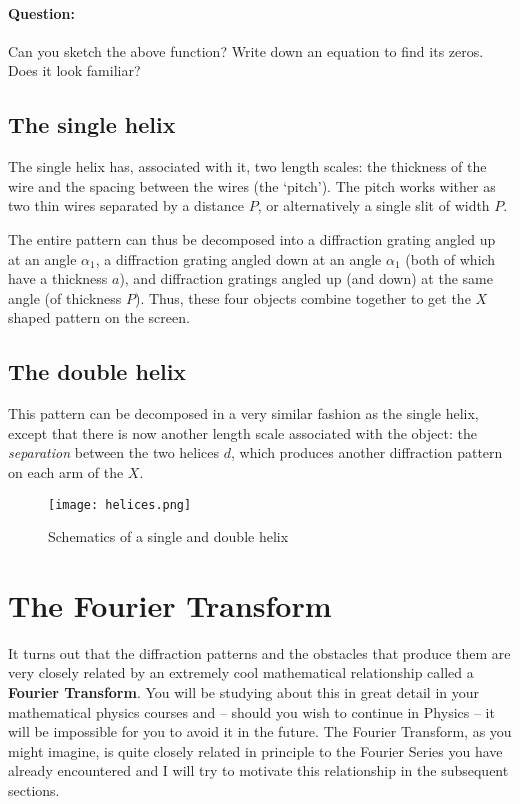 \begin{tcolorbox}
\paragraph{Question: } Can you sketch the above function? Write down an equation to find its zeros. Does it look familiar?
\end{tcolorbox}

\subsection{The single helix}

The single helix has, associated with it, two length scales: the thickness of the wire and the spacing between the wires (the `pitch'). The pitch works wither as two thin wires separated by a distance $P$, or alternatively a single slit of width $P$.

The entire pattern can thus be decomposed into a diffraction grating angled up at an angle $\alpha_1$, a diffraction grating angled down at an angle $\alpha_1$ (both of which have a thickness $a$), and diffraction gratings angled up (and down) at the same angle (of thickness $P$). Thus, these four objects combine together to get the $X$ shaped pattern on the screen.

\subsection{The double helix}

This pattern can be decomposed in a very similar fashion as the single helix, except that there is now another length scale associated with the object: the \textit{separation} between the two helices $d$, which produces another diffraction pattern on each arm of the $X$.



\begin{figure}[!htb]
\centering
\texttt{[image: helices.png]}
\caption{Schematics of a single and double helix}
\label{helix}
\end{figure}



\section{The Fourier Transform}

It turns out that the diffraction patterns and the obstacles that produce them are very closely related by an extremely cool mathematical relationship called a \textbf{Fourier Transform}. You will be studying about this in great detail in your mathematical physics courses and -- should you wish to continue in Physics --  it will be impossible for you to avoid it in the future. The Fourier Transform, as you might imagine, is quite closely related in principle to the Fourier Series you have already encountered and I will try to motivate this relationship in the subsequent sections.

